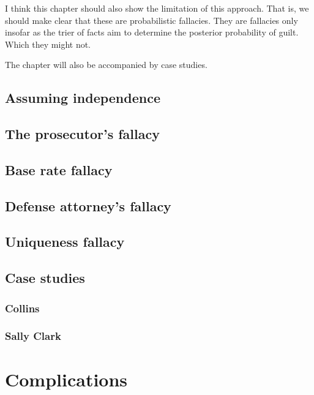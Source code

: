 \documentclass[]{book}
\begin{document}
I think this chapter should also show the limitation of this approach.
That is, we should make clear that these are probabilistic fallacies.
They are fallacies only insofar as the trier of facts aim to determine
the posterior probability of guilt. Which they might not.

The chapter will also be accompanied by case studies.

\section{Assuming independence}

\section{The prosecutor's fallacy}

\section{Base rate fallacy}

\section{Defense attorney's fallacy}

\section{Uniqueness fallacy}

\section{Case studies}

\subsection{Collins}

\subsection{Sally Clark}

\chapter{Complications}

\end{document}
